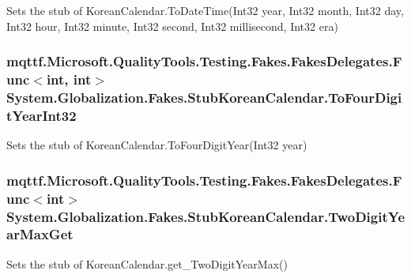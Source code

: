 Sets the stub of Korean\-Calendar.\-To\-Date\-Time(\-Int32 year, Int32 month, Int32 day, Int32 hour, Int32 minute, Int32 second, Int32 millisecond, Int32 era)

\hypertarget{class_system_1_1_globalization_1_1_fakes_1_1_stub_korean_calendar_aef6a88fa0d76bb2000b2c3d163d0dce7}{
\subsubsection[{To\-Four\-Digit\-Year\-Int32}]{\setlength{\rightskip}{0pt plus 5cm}mqttf.\-Microsoft.\-Quality\-Tools.\-Testing.\-Fakes.\-Fakes\-Delegates.\-Func$<$int, int$>$ System.\-Globalization.\-Fakes.\-Stub\-Korean\-Calendar.\-To\-Four\-Digit\-Year\-Int32}}\label{class_system_1_1_globalization_1_1_fakes_1_1_stub_korean_calendar_aef6a88fa0d76bb2000b2c3d163d0dce7}


Sets the stub of Korean\-Calendar.\-To\-Four\-Digit\-Year(\-Int32 year)

\hypertarget{class_system_1_1_globalization_1_1_fakes_1_1_stub_korean_calendar_abcc07f502744eb9a4cc68646eaab4561}{
\subsubsection[{Two\-Digit\-Year\-Max\-Get}]{\setlength{\rightskip}{0pt plus 5cm}mqttf.\-Microsoft.\-Quality\-Tools.\-Testing.\-Fakes.\-Fakes\-Delegates.\-Func$<$int$>$ System.\-Globalization.\-Fakes.\-Stub\-Korean\-Calendar.\-Two\-Digit\-Year\-Max\-Get}}\label{class_system_1_1_globalization_1_1_fakes_1_1_stub_korean_calendar_abcc07f502744eb9a4cc68646eaab4561}


Sets the stub of Korean\-Calendar.\-get\-\_\-\-Two\-Digit\-Year\-Max()

